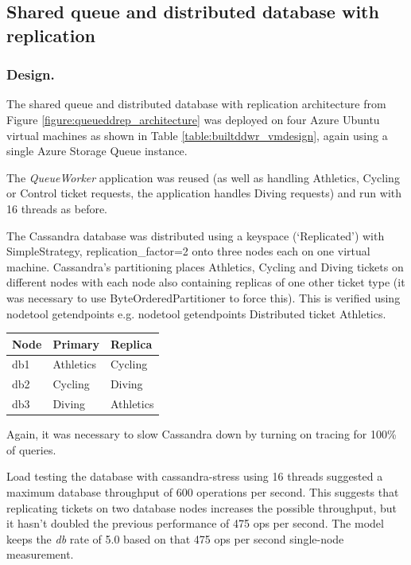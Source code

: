 \documentclass[runningheads]{llncs}
\begin{document}
%
%
\FloatBarrier
\subsection{Shared queue and distributed database with replication}

\subsubsection{Design.}  The shared queue and distributed database with replication architecture from Figure \ref{figure:queueddrep_architecture} was deployed on four Azure Ubuntu virtual machines as shown in Table \ref{table:builtddwr_vmdesign}, again using a single Azure Storage Queue instance.

The {\itshape QueueWorker} application was reused (as well as handling Athletics, Cycling or Control ticket requests, the application handles Diving requests) and run with 16 threads as before.

The Cassandra database was distributed using a keyspace (`Replicated') with SimpleStrategy, replication\_factor=2 onto three nodes each on one virtual machine.  Cassandra's partitioning places Athletics, Cycling and Diving tickets on different nodes with each node also containing replicas of one other ticket type (it was necessary to use ByteOrderedPartitioner to force this).  This is verified using nodetool getendpoints e.g. nodetool getendpoints Distributed ticket Athletics.

\begin{center}
	\begin{tabular}{l | l | l}
		Node	& Primary	& Replica \\
		\hline
		db1		& Athletics	& Cycling \\
		db2		& Cycling	& Diving \\
		db3		& Diving	& Athletics \\
	\end{tabular}
\end{center}

Again, it was necessary to slow Cassandra down by turning on tracing for 100\% of queries.

Load testing the database with cassandra-stress using 16 threads suggested a maximum database throughput of 600 operations per second.  This suggests that replicating tickets on two database nodes increases the possible throughput, but it hasn't doubled the previous performance of 475 ops per second.  The model keeps the {\itshape db} rate of 5.0 based on that 475 ops per second single-node measurement.
\end{document}
